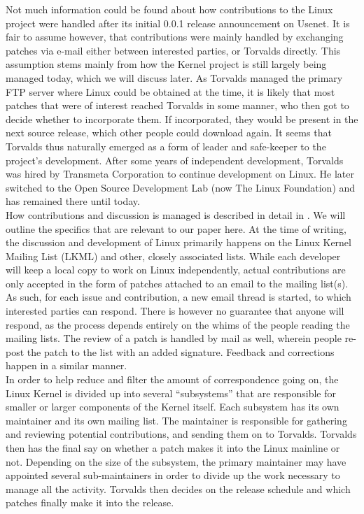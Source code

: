 Not much information could be found about how contributions to the Linux project were handled after its initial 0.0.1 release announcement on Usenet. It is fair to assume however, that contributions were mainly handled by exchanging patches via e-mail either between interested parties, or Torvalds directly. This assumption stems mainly from how the Kernel project is still largely being managed today, which we will discuss later. As Torvalds managed the primary FTP server where Linux could be obtained at the time, it is likely that most patches that were of interest reached Torvalds in some manner, who then got to decide whether to incorporate them. If incorporated, they would be present in the next source release, which other people could download again. It seems that Torvalds thus naturally emerged as a form of leader and safe-keeper to the project's development. After some years of independent development, Torvalds was hired by Transmeta Corporation\cite{transmeta} to continue development on Linux. He later switched to the Open Source Development Lab (now The Linux Foundation) and has remained there until today.\cite{linus-biography,linus-osdl} \\
How contributions and discussion is managed is described in detail in \cite{linux-participation}. We will outline the specifics that are relevant to our paper here. At the time of writing, the discussion and development of Linux primarily happens on the Linux Kernel Mailing List (LKML) and other, closely associated lists. While each developer will keep a local copy to work on Linux independently, actual contributions are only accepted in the form of patches attached to an email to the mailing list(s). As such, for each issue and contribution, a new email thread is started, to which interested parties can respond. There is however no guarantee that anyone will respond, as the process depends entirely on the whims of the people reading the mailing lists. The review of a patch is handled by mail as well, wherein people re-post the patch to the list with an added signature. Feedback and corrections happen in a similar manner. \\

In order to help reduce and filter the amount of correspondence going on, the Linux Kernel is divided up into several ``subsystems'' that are responsible for smaller or larger components of the Kernel itself. Each subsystem has its own maintainer and its own mailing list. The maintainer is responsible for gathering and reviewing potential contributions, and sending them on to Torvalds. Torvalds then has the final say on whether a patch makes it into the Linux mainline or not. Depending on the size of the subsystem, the primary maintainer may have appointed several sub-maintainers in order to divide up the work necessary to manage all the activity. Torvalds then decides on the release schedule and which patches finally make it into the release. \\

